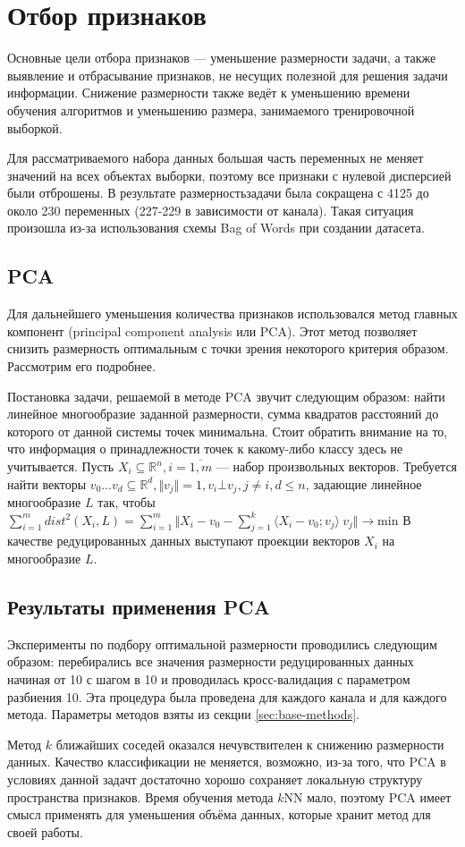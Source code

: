 \section{Отбор признаков}
Основные цели отбора признаков --- уменьшение размерности задачи, а также выявление и отбрасывание признаков,
 не несущих полезной для решения задачи информации. Снижение размерности также ведёт к уменьшению времени обучения алгоритмов и уменьшению размера, занимаемого тренировочной выборкой.
 \par
Для рассматриваемого набора данных большая часть переменных не меняет значений на всех объектах выборки,
 поэтому все признаки с нулевой дисперсией были отброшены. В результате размерностьзадачи была сокращена
 с 4125 до около 230 переменных (227-229 в зависимости от канала). Такая ситуация произошла из-за использования схемы Bag of Words при создании датасета. 
 \subsection{PCA}
 Для дальнейшего уменьшения количества признаков использовался метод главных компонент
 (principal component analysis или PCA)\cite{pearson}. Этот метод позволяет снизить размерность оптимальным с точки зрения некоторого критерия образом. Рассмотрим его подробнее.
 \par
 Постановка задачи, решаемой в методе PCA звучит следующим образом: найти линейное многообразие заданной 
 размерности, сумма квадратов расстояний до которого от данной системы точек минимальна. Стоит обратить внимание на то, что информация о принадлежности точек к какому-либо классу здесь не учитывается.
 Пусть \( X_i \subseteq \mathbb{R}^n, i=\overline{1,m} \) --- набор произвольных векторов. Требуется найти векторы \(v_0\ldots v_d\subseteq \mathbb{R}^d, \Vert v_j \Vert = 1, v_i \bot v_j, j \neq  i, d \leq n\), задающие линейное многообразие \(L\) так, чтобы \(
 \sum_{i=1}^{m} dist^2(X_i, L) = \sum_{i=1}^{m}\Vert X_i - v_0 - \sum_{j=1}^k\langle X_i - v_0; v_j\rangle\ v_j \Vert\rightarrow \mathrm{min}\) В качестве редуцированных данных выступают проекции векторов \( X_i\) на многообразие \(L\). 
 
 
 
 \subsection*{Результаты применения PCA}
 Эксперименты по подбору оптимальной размерности проводились следующим образом: перебирались все значения 
 размерности редуцированных данных начиная от 10 с шагом в 10 и проводилась кросс-валидация с параметром разбиения 10. Эта процедура была проведена для каждого канала и для каждого метода. Параметры методов 
 взяты из секции \ref{sec:base-methods}.
\par
Метод \(k\) ближайших соседей оказался нечувствителен к снижению размерности данных. Качество классификации не меняется, возможно, из-за того, что PCA в условиях данной задачт достаточно хорошо сохраняет локальную структуру пространства признаков. Время обучения метода \(k\)NN мало, поэтому PCA
имеет смысл применять для уменьшения объёма данных, которые хранит метод для своей работы.


